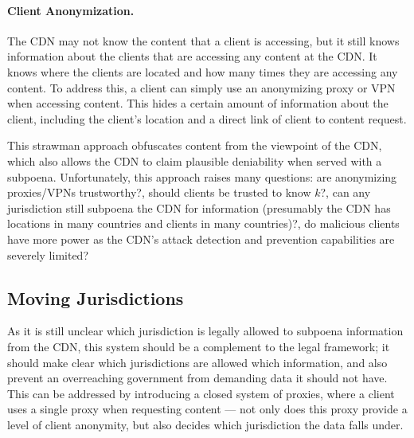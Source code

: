 \paragraph{Client Anonymization.}  The CDN may not know the content that a client is accessing, but it 
still knows information about the clients that are accessing any content at the CDN.  It knows 
where the clients are located and how many times they are accessing any content.  To address this, 
a client can simply use an anonymizing proxy or VPN when accessing content.  This hides a certain 
amount of information about the client, including the client's location and a direct link of 
client to content request.

This strawman approach obfuscates content from the viewpoint of the CDN, which also allows the CDN 
to claim plausible deniability when served with a subpoena.  Unfortunately, this approach raises 
many questions: are anonymizing proxies/VPNs trustworthy?, should clients be trusted to know $k$?, 
can any jurisdiction still subpoena the CDN for information (presumably the CDN has locations in many 
countries and clients in many countries)?, do malicious clients have more power as the CDN's attack 
detection and prevention capabilities are severely limited?

\subsection{Moving Jurisdictions}
As it is still unclear which jurisdiction is legally allowed to subpoena information from the CDN, this 
system should be a complement to the legal framework; it should make clear which jurisdictions are allowed 
which information, and also prevent an overreaching government from demanding data it should not have.  This 
can be addressed by introducing a closed system of proxies, where a client uses a single proxy when requesting 
content --- not only does this proxy provide a level of client anonymity, but also decides which jurisdiction 
the data falls under.  

